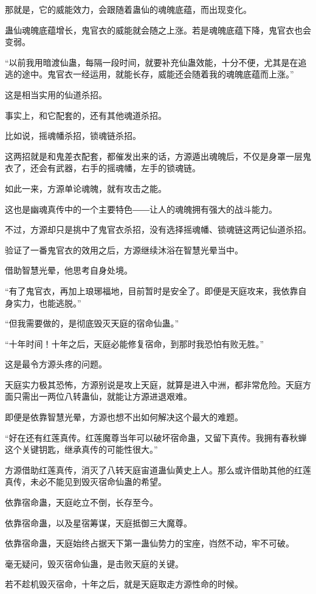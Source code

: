 \begin{this_body}
那就是，它的威能效力，会跟随着蛊仙的魂魄底蕴，而出现变化。

蛊仙魂魄底蕴增长，鬼官衣的威能就会随之上涨。若是魂魄底蕴下降，鬼官衣也会变弱。

“以前我用暗渡仙蛊，每隔一段时间，就要补充仙蛊效能，十分不便，尤其是在追逃的途中。鬼官衣一经运用，就能长存，威能还会随着我的魂魄底蕴而上涨。”

这是相当实用的仙道杀招。

事实上，和它配套的，还有其他魂道杀招。

比如说，摇魂幡杀招，锁魂链杀招。

这两招就是和鬼差衣配套，都催发出来的话，方源遁出魂魄后，不仅是身罩一层鬼衣了，还会有武器，右手的摇魂幡，左手的锁魂链。

如此一来，方源单论魂魄，就有攻击之能。

这也是幽魂真传中的一个主要特色――让人的魂魄拥有强大的战斗能力。

不过，方源却只是挑中了鬼官衣杀招，没有选择摇魂幡、锁魂链这两记仙道杀招。

验证了一番鬼官衣的效用之后，方源继续沐浴在智慧光晕当中。

借助智慧光晕，他思考自身处境。

“有了鬼官衣，再加上琅琊福地，目前暂时是安全了。即便是天庭攻来，我依靠自身实力，也能逃脱。”

“但我需要做的，是彻底毁灭天庭的宿命仙蛊。”

“十年时间！十年之后，天庭必能修复宿命，到那时我恐怕有败无胜。”

这是最令方源头疼的问题。

天庭实力极其恐怖，方源别说是攻上天庭，就算是进入中洲，都非常危险。天庭方面只需出一两位八转蛊仙，就能让方源进退艰难。

即便是依靠智慧光晕，方源也想不出如何解决这个最大的难题。

“好在还有红莲真传。红莲魔尊当年可以破坏宿命蛊，又留下真传。我拥有春秋蝉这个关键钥匙，继承真传的可能性很大。”

方源借助红莲真传，消灭了八转天庭宙道蛊仙黄史上人。那么或许借助其他的红莲真传，未必不能见到毁灭宿命仙蛊的希望。

依靠宿命蛊，天庭屹立不倒，长存至今。

依靠宿命蛊，以及星宿筹谋，天庭抵御三大魔尊。

依靠宿命蛊，天庭始终占据天下第一蛊仙势力的宝座，岿然不动，牢不可破。

毫无疑问，毁灭宿命仙蛊，是击败天庭的关键。

若不趁机毁灭宿命，十年之后，就是天庭取走方源性命的时候。


\end{this_body}
